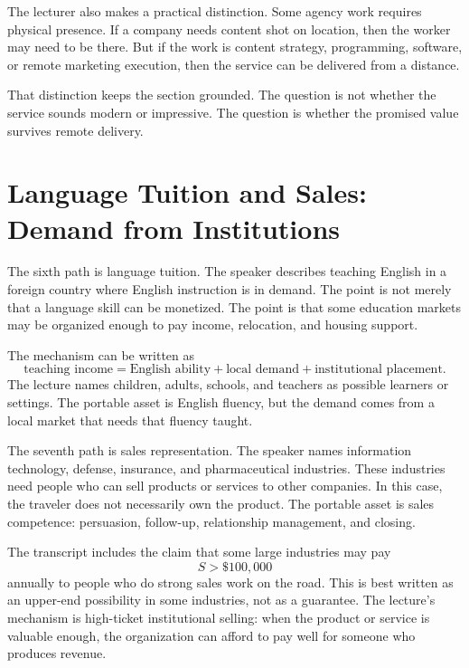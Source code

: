 The lecturer also makes a practical distinction. Some agency work requires physical presence. If a company needs content shot on location, then the worker may need to be there. But if the work is content strategy, programming, software, or remote marketing execution, then the service can be delivered from a distance.

That distinction keeps the section grounded. The question is not whether the service sounds modern or impressive. The question is whether the promised value survives remote delivery.

\section{Language Tuition and Sales: Demand from Institutions}

The sixth path is language tuition. The speaker describes teaching English in a foreign country where English instruction is in demand. The point is not merely that a language skill can be monetized. The point is that some education markets may be organized enough to pay income, relocation, and housing support.

The mechanism can be written as
\begin{equation}
\text{teaching income}
=
\text{English ability}
+
\text{local demand}
+
\text{institutional placement}.
\end{equation}
The lecture names children, adults, schools, and teachers as possible learners or settings. The portable asset is English fluency, but the demand comes from a local market that needs that fluency taught.

The seventh path is sales representation. The speaker names information technology, defense, insurance, and pharmaceutical industries. These industries need people who can sell products or services to other companies. In this case, the traveler does not necessarily own the product. The portable asset is sales competence: persuasion, follow-up, relationship management, and closing.

The transcript includes the claim that some large industries may pay
\begin{equation}
S>\$100{,}000
\end{equation}
annually to people who do strong sales work on the road. This is best written as an upper-end possibility in some industries, not as a guarantee. The lecture's mechanism is high-ticket institutional selling: when the product or service is valuable enough, the organization can afford to pay well for someone who produces revenue.

